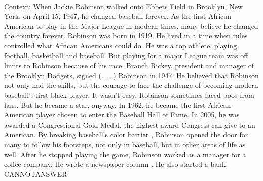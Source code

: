 \documentclass[11pt,a4paper, onecolumn]{article}
\begin{document}
\\ Context: When Jackie Robinson walked onto Ebbets Field in Brooklyn, New York, on April 15, 1947, he changed baseball forever. As the first African American to play in the Major League in modern times, many believe he changed the country forever. Robinson was born in 1919. He lived in a time when rules controlled what African Americans could do. He was a top athlete, playing football, basketball and baseball. But playing for a major League team was off limits to Robinson because of his race. Branch Rickey, president and manager of the Brooklyn Dodgers, signed (......) Robinson in 1947. He believed that Robinson not only had the skills, but the courage to face the challenge of becoming modern baseball's first black player. It wasn't easy. Robinson sometimes faced boos from fans. But he became a star, anyway. In 1962, he became the first African-American player chosen to enter the Baseball Hall of Fame. In 2005, he was awarded a Congressional Gold Medal, the highest award Congress can give to an American. By breaking baseball's color barrier , Robinson opened the door for many to follow his footsteps, not only in baseball, but in other areas of life as well. After he stopped playing the game, Robinson worked as a manager for a coffee company. He wrote a newspaper column . He also started a bank. CANNOTANSWER
\end{document}
